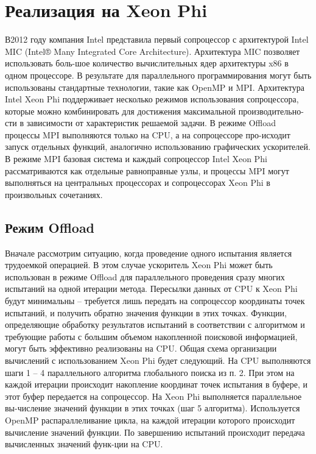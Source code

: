 \section{Реализация на Xeon Phi}
В2012 году компания Intel представила первый сопроцессор с архитектурой Intel MIC (Intel® Many Integrated Core Architecture). Архитектура MIC позволяет использовать боль-шое количество вычислительных ядер архитектуры x86 в одном процессоре. В результате для параллельного программирования могут быть использованы стандартные технологии, такие как OpenMP и MPI. 
Архитектура Intel Xeon Phi поддерживает несколько режимов использования сопроцессора, которые можно комбинировать для достижения максимальной производительно-сти в зависимости от характеристик решаемой задачи. 
В режиме Offload процессы MPI выполняются только на CPU, а на сопроцессоре про-исходит запуск отдельных функций, аналогично использованию графических ускорителей.
В режиме MPI базовая система и каждый сопроцессор Intel Xeon Phi рассматриваются как отдельные равноправные узлы, и процессы MPI могут выполняться на центральных процессорах и сопроцессорах Xeon Phi в произвольных сочетаниях.
\subsection{Режим Offload}
Вначале рассмотрим ситуацию, когда проведение одного испытания является трудоемкой операцией. В этом случае ускоритель Xeon Phi может быть использован в режиме Offload для параллельного проведения сразу многих испытаний на одной итерации метода. Пересылки данных от CPU к Xeon Phi будут минимальны – требуется лишь передать на сопроцессор координаты точек испытаний, и получить обратно значения функции в этих точках. Функции, определяющие обработку результатов испытаний в соответствии с алгоритмом и требующие работы с большим объемом накопленной поисковой информацией, могут быть эффективно реализованы на CPU. Общая схема организации вычислений с использованием Xeon Phi будет следующий.
На CPU выполняются шаги 1 – 4 параллельного алгоритма глобального поиска из п. 2. При этом на каждой итерации происходит накопление координат точек испытания в буфере, и этот буфер передается на сопроцессор. На Xeon Phi выполняется параллельное вы-числение значений функции в этих точках (шаг 5 алгоритма). Используется OpenMP распараллеливание цикла, на каждой итерации которого происходит вычисление значений функции. По завершению испытаний происходит передача вычисленных значений функ-ции на CPU. 
